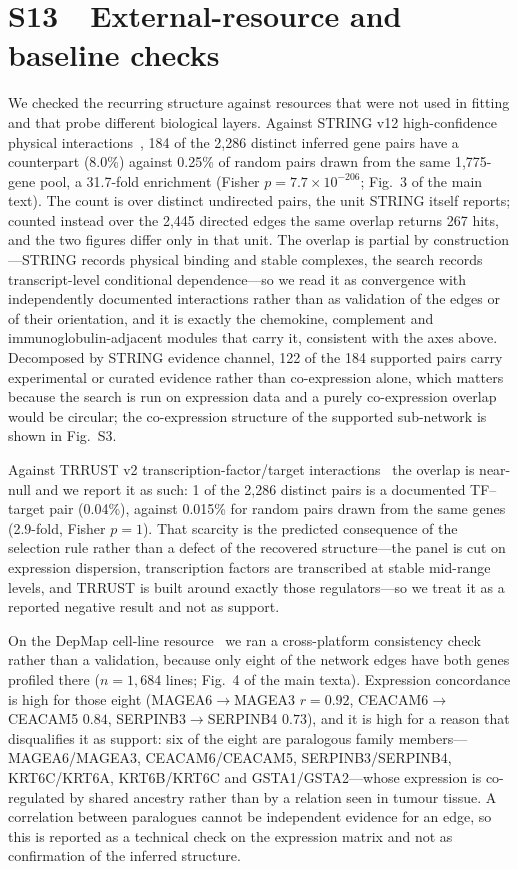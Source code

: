 \documentclass[11pt]{article}
\begin{document}
\section*{S13\ \ External-resource and baseline checks}

We checked the recurring structure against resources that were not used in fitting and that probe different biological layers. Against STRING v12 high-confidence physical interactions~\citep{szklarczyk2025string},
184 of the 2{,}286 distinct inferred gene pairs have a counterpart (8.0\%) against 0.25\% of
random pairs drawn from the same 1{,}775-gene pool, a 31.7-fold enrichment (Fisher
$p = 7.7 \times 10^{-206}$; Fig.~3 of the main text). The count is over distinct undirected pairs,
the unit STRING itself reports; counted instead over the 2{,}445 directed edges the same overlap
returns 267 hits, and the two figures differ only in that unit. The overlap is partial by
construction---STRING records physical binding and stable complexes, the search records
transcript-level conditional dependence---so we read it as convergence with independently
documented interactions rather than as validation of the edges or of their orientation, and
it is exactly the chemokine, complement and
immunoglobulin-adjacent modules that carry it, consistent with the axes above. Decomposed by
STRING evidence channel, 122 of the 184 supported pairs carry experimental or curated evidence
rather than co-expression alone, which matters because the search is run on expression data and
a purely co-expression overlap would be circular; the co-expression structure of the supported
sub-network is shown in Fig.~S3.

Against TRRUST v2 transcription-factor/target interactions~\citep{han2018trrust} the overlap is near-null and we report it as such: 1 of the 2{,}286 distinct pairs is a documented TF--target pair (0.04\%), against 0.015\% for random pairs drawn from the same genes (2.9-fold, Fisher $p = 1$). That scarcity is the predicted consequence of the selection rule rather than a defect of the recovered structure---the panel is cut on expression dispersion, transcription factors are transcribed at stable mid-range levels, and TRRUST is built around exactly those regulators---so we treat it as a reported negative result and not as support.



On the DepMap cell-line resource~\citep{tsherniak2017defining} we ran a cross-platform
consistency check rather than a validation, because only eight of the network edges have both
genes profiled there ($n = 1{,}684$ lines; Fig.~4 of the main texta). Expression concordance is
high for those eight (MAGEA6$\rightarrow$MAGEA3 $r = 0.92$, CEACAM6$\rightarrow$CEACAM5 $0.84$,
SERPINB3$\rightarrow$SERPINB4 $0.73$), and it is high for a reason that disqualifies it as
support: six of the eight are paralogous family members---MAGEA6/MAGEA3, CEACAM6/CEACAM5,
SERPINB3/SERPINB4, KRT6C/KRT6A, KRT6B/KRT6C and GSTA1/GSTA2---whose expression is co-regulated
by shared ancestry rather than by a relation seen in tumour tissue. A correlation between
paralogues cannot be independent evidence for an edge, so this is reported as a technical check
on the expression matrix and not as confirmation of the inferred structure.
\end{document}
